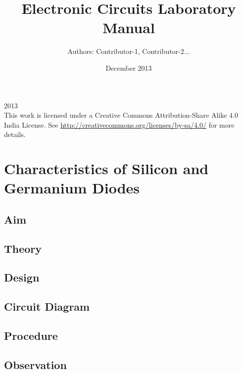 \documentclass{book}
\begin{document}
\thispagestyle{empty}
\thispagestyle{empty}

\title{Electronic Circuits
Laboratory Manual}
\date{December 2013}
\author {Authors: Contributor-1, Contributor-2...}
\maketitle
  
\textcopyright{}2013
\\[5cm]
    This work is licensed under a Creative Commons Attribution-Share Alike 4.0 India License. See \url{http://creativecommons.org/licenses/by-sa/4.0/} for more details.






\thispagestyle{empty}
\tableofcontents
\thispagestyle{empty}
\thispagestyle{empty}

\listoffigures
\thispagestyle{empty}


\chapter[Characteristics of Diodes]
{Characteristics of Silicon and Germanium Diodes}


\section*{Aim}
\section*{Theory}
\section*{Design}
\section*{Circuit Diagram}
\section*{Procedure}
\section*{Observation}
\end{document}
